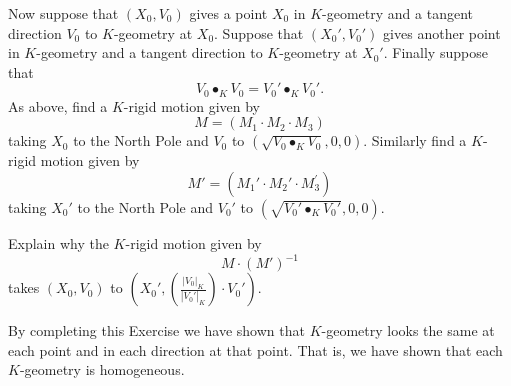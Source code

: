 \documentclass{ximera}
\begin{document}
Now suppose that $\left(  X_{0},V_{0}\right)  $ gives a point $X_{0}$ in
$K$-geometry and a tangent direction $V_{0}$ to $K$-geometry at $X_{0}$.
Suppose that $\left(  X_{0}',V_{0}'\right)  $ gives another
point in $K$-geometry and a tangent direction to $K$-geometry at
$X_{0}'$. Finally suppose that%
\[
V_{0}\bullet_{K}V_{0}=V_{0}'\bullet_{K}V_{0}'.
\]
As above, find a $K$-rigid motion given by%
\[
M=\left(  M_{1}\cdot M_{2}\cdot M_{3}\right)
\]
taking $X_{0}$ to the North Pole and $V_{0}$ to $\left(  \sqrt{V_{0}%
\bullet_{K}V_{0}},0,0\right)  $. Similarly find a $K$-rigid motion given by%
\[
M'=\left(  M_{1}'\cdot M_{2}'\cdot M_{3}^{\prime
}\right)
\]
taking $X_{0}'$ to the North Pole and $V_{0}'$ to $\left(
\sqrt{V_{0}'\bullet_{K}V_{0}'},0,0\right)  .$

\begin{exercise}
\label{64} Explain why the $K$-rigid motion given by%
\[
M\cdot\left(  M'\right)  ^{-1}%
\]
takes $\left(  X_{0},V_{0}\right)  $ to $\left(  X_{0}',\left(
\frac{\left\vert V_{0}\right\vert _{K}}{\left\vert V_{0}'\right\vert
_{K}}\right)  \cdot V_{0}'\right)  $.
\end{exercise}

By completing this Exercise we have shown that $K$-geometry looks the same at
each point and in each direction at that point. That is, we have shown that
each $K$-geometry is homogeneous.
\end{document}
